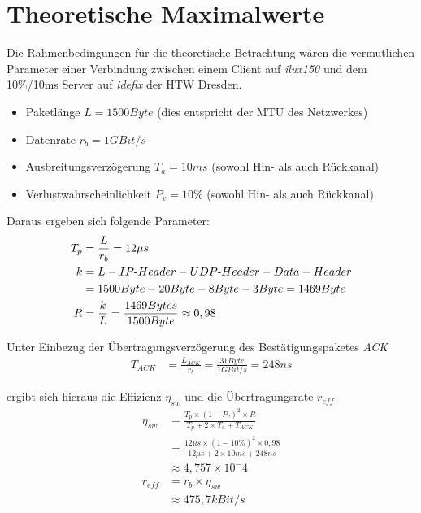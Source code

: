 \section{Theoretische Maximalwerte}

Die Rahmenbedingungen für die theoretische Betrachtung wären die vermutlichen Parameter einer Verbindung zwischen einem Client auf \textit{ilux150} und dem 10\%/10ms Server auf \textit{idefix} der HTW Dresden.

\begin{itemize}
	\item Paketlänge \(L = 1500Byte\) (dies entspricht der MTU des Netzwerkes)
	\item Datenrate \(r_{b} = 1 GBit/s\)
	\item Ausbreitungsverzögerung \(T_{a} = 10ms\) (sowohl Hin- als auch Rückkanal)
	\item Verlustwahrscheinlichkeit \(P_{v} = 10\%\) (sowohl Hin- als auch Rückkanal)
\end{itemize}

Daraus ergeben sich folgende Parameter:
\begin{align*}
	T_{p} & = \frac{L}{r_{b}} = 12\mu s                                          \\
	k     & = L - IP\textnormal{-}Header - UDP\textnormal{-}Header - Data-Header \\
	      & = 1500Byte - 20Byte - 8Byte - 3Byte = 1469Byte                       \\
	R     & = \frac{k}{L} = \frac{1469Bytes}{1500Byte} \approx 0,98
\end{align*}

\newpage

Unter Einbezug der Übertragungsverzögerung des Bestätigungspaketes \textit{ACK}
\begin{align*}
	T_{ACK} & = \frac{L_{ACK}}{r_{b}} = \frac{31Byte}{1GBit/s} = 248ns
\end{align*}

ergibt sich hieraus die Effizienz \(\eta_{sw}\) und die Übertragungsrate \(r_{eff}\)
\begin{align*}
	\eta_{sw} & = \frac{T_{p} \times (1 - P_{v})^2 \times R}{T_{p} + 2 \times T_{a} + T_{ACK}}    \\
	          & = \frac{12\mu s \times (1 - 10\%)^2 \times 0,98}{12\mu s + 2 \times 10ms + 248ns} \\
	          & \approx 4,757 \times 10^-4                                                        \\
	r_{eff}   & = r_{b} \times \eta_{sw}                                                          \\
	          & \approx 475,7kBit/s
\end{align*}

